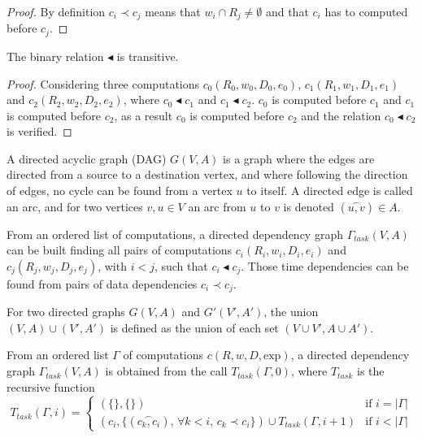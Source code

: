 \begin{proof}
By definition $c_i \prec c_j$ means that $w_i\cap R_j \neq \emptyset$ and that $c_i$ has to computed before $c_j$. %
\end{proof}

\begin{myprop}
The binary relation $\blacktriangleleft$ is transitive. 
\end{myprop}

\begin{proof}
Considering three computations $c_0(R_0,w_0,D_0,e_0)$, $c_1(R_1,w_1,D_1,e_1)$ and $c_2(R_2,w_2,D_2,e_2)$, where $c_0 \blacktriangleleft c_1$ and $c_1 \blacktriangleleft c_2$. $c_0$ is computed before $c_1$ and $c_1$ is computed before $c_2$, as a result $c_0$ is computed before $c_2$ and the relation $c_0 \blacktriangleleft c_2$ is verified. 
\end{proof}

\begin{mydef}
A directed acyclic graph (DAG) $G(V,A)$ is a graph where the edges are directed from a source to a destination vertex, and where following the direction of edges, no cycle can be found from a vertex $u$ to itself. A directed edge is called an arc, and for two vertices $v,u \in V$ an arc from $u$ to $v$ is denoted $(\overset{\frown}{u,v}) \in A$.
\end{mydef}

From an ordered list of computations, a directed dependency graph $\Gamma_{task}(V,A)$ can be built finding all pairs of computations $c_i(R_i,w_i,D_i,e_i)$ and $c_j(R_j,w_j,D_j,e_j)$, with $i<j$, such that $c_i \blacktriangleleft c_j$. Those time dependencies can be found from pairs of data dependencies $c_i \prec c_j$.

\begin{mydef}
For two directed graphs $G(V,A)$ and $G'(V',A')$, the union $(V,A)\cup (V',A')$ is defined as the union of each set $(V\cup V', A \cup A')$.
\end{mydef}

\begin{mydef}
From an ordered list $\Gamma$ of computations $c(R,w,D,\text{exp})$, a directed dependency graph $\Gamma_{task}(V,A)$ is obtained from the call $T_{task}(\Gamma,0)$, where $T_{task}$ is the recursive function
\begin{equation*}
T_{task}(\Gamma,i) = 
\begin{cases} 	(\{\},\{\}) & \mbox{if }i=|\Gamma|\\
				(c_i, \{(\overset{\frown}{c_k,c_i})\mbox{, }\forall k < i \mbox{, } c_k\prec c_i \})\cup T_{task}(\Gamma,i+1) & \mbox{if }i<|\Gamma|
\end{cases}
\end{equation*}
\end{mydef}

